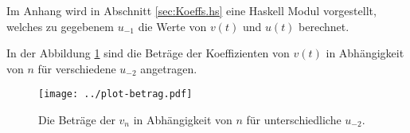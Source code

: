\begin{comment}
WEITER VEREINFACHEN:\\
\begin{align*}
v_{-1}&=\frac{1}{2} & u_{-1}&=-\frac{3}{2}
\\v_{0} = -u_{0} &= -\frac{3}{4u_{-2}}
\\v_n = - u_n &= \frac{1}{u_{-2}}
  \left((n+1)v_{n-1} + \sum_{k=1}^{n-1} v_{k-1}v_{n-k-1}\right)
  & & \forall n > 0
\end{align*}
Dies können wir, wie folgt, weiter umschreiben und setzte dazu
\begin{align*}
v_{i}&:=\frac{1}{u_{-2}^{i+1}}\tilde v_i
  &u_{i}&:=\frac{1}{u_{-2}^{i+1}}\tilde u_i
  & & \forall n > -1
\end{align*}
Dann gilt:
\begin{align*}
\tilde v_{-1}&:=\frac{1}{2} & \tilde u_{-1}&:=-\frac{3}{2}
\\\tilde v_{0} := -\tilde u_{0} &:= -\frac{3}{4}
\end{align*}
und mit
\begin{align*}
v_n &= \frac{1}{u_{-2}}
  \left((n+1)v_{n-1} + \sum_{k=1}^{n-1} v_{k-1}v_{n-k-1}\right)
\\&= \frac{1}{u_{-2}}
  \left(
  (n+1)\frac{1}{u_{-2}^{n}}\tilde u_{n-1}
  + \sum_{k=1}^{n-1}
    \frac{1}{u_{-2}^{k}}\tilde v_{k-1}
    \frac{1}{u_{-2}^{n-k}}\tilde v_{n-k-1}
  \right)
\\&= \frac{1}{u_{-2}^{n+1}}
  \Bigg( \underset{=:\tilde v_n =:-\tilde u_n}{\underbrace{ 
  (n+1)\tilde u_{n-1} + \sum_{k=1}^{n-1} \tilde v_{k-1} \tilde v_{n-k-1}
  }} \Bigg)
\end{align*}
definieren wir
\begin{align*}
\tilde v_n := -\tilde u_n &:=
  (n+1)\tilde v_{n-1} + \sum_{k=1}^{n-1}\tilde v_{k-1}\tilde v_{n-k-1}
  & & \forall n > 0
\end{align*}
\end{comment}
Im Anhang wird in Abschnitt \ref{sec:Koeffs.hs} eine Haskell Modul vorgestellt,
welches zu gegebenem $u_{-1}$ die Werte von $v(t)$ und $u(t)$ berechnet.

In der Abbildung \ref{fig:plotKoeffs} sind die Beträge der Koeffizienten von
$v(t)$ in Abhängigkeit von $n$ für verschiedene $u_{-2}$ angetragen.
\begin{figure}[htbp]
  \centering
  \texttt{[image: ../plot-betrag.pdf]}
  \caption%
   {Die Beträge der $v_n$ in Abhängigkeit von $n$ für unterschiedliche
     $u_{-2}$.}
  \label{fig:plotKoeffs}
\end{figure}

